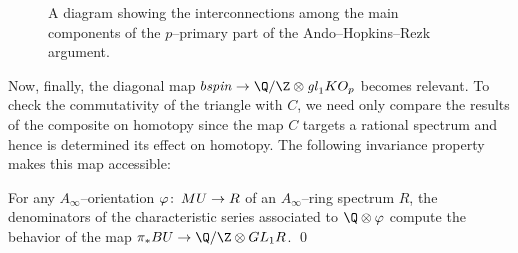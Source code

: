 \begin{sidewaysfigure}
\centering
{}
\caption{A diagram showing the interconnections among the main components of the \(p\)--primary part of the Ando--Hopkins--Rezk argument.}\label{MainAHRDiagram}
\end{sidewaysfigure}

Now, finally, the diagonal map \(b\spin \to \Q/\Z \otimes \gl_1 KO_p\) becomes relevant.  To check the commutativity of the triangle with \(C\), we need only compare the results of the composite on homotopy since the map \(C\) targets a rational spectrum and hence is determined its effect on homotopy.  The following invariance property makes this map accessible:

\begin{theorem}
For any \(A_\infty\)--orientation \(\varphi\colon\thinspace MU \to R\) of an \(A_\infty\)--ring spectrum \(R\), the denominators of the characteristic series associated to \(\Q \otimes \phi\) compute the behavior of the map \(\pi_* BU \to \Q / \Z \otimes GL_1 R\). \qed
\end{theorem}

